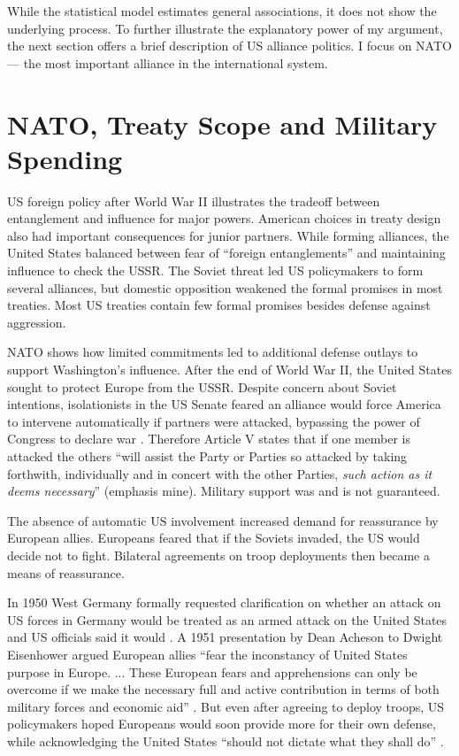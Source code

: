 \documentclass[12pt]{article}
\begin{document}
While the statistical model estimates general associations, it does not show the underlying process. 
To further illustrate the explanatory power of my argument, the next section offers a brief description of US alliance politics.   
I focus on NATO--- the most important alliance in the international system.  


\section{NATO, Treaty Scope and Military Spending}


US foreign policy after World War II illustrates the tradeoff between entanglement and influence for major powers.
American choices in treaty design also had important consequences for junior partners. 
While forming alliances, the United States balanced between fear of ``foreign entanglements'' and maintaining influence to check the USSR.
The Soviet threat led US policymakers to form several alliances, but domestic opposition weakened the formal promises in most treaties. 
Most US treaties contain few formal promises besides defense against aggression.  


NATO shows how limited commitments led to additional defense outlays to support Washington's influence.
After the end of World War II, the United States sought to protect Europe from the USSR. 
Despite concern about Soviet intentions, isolationists in the US Senate feared an alliance would force America to intervene automatically if partners were attacked, bypassing the power of Congress to declare war \citep[pg. 280-1]{Acheson1969}.
Therefore Article V states that if one member is attacked the others ``will assist the Party or Parties so attacked by taking forthwith, individually and in concert with the other Parties, \emph{such action as it deems necessary}'' (emphasis mine). 
Military support was and is not guaranteed. 


The absence of automatic US involvement increased demand for reassurance by European allies. 
Europeans feared that if the Soviets invaded, the US would decide not to fight. 
Bilateral agreements on troop deployments then became a means of reassurance. 


In 1950 West Germany formally requested clarification on whether an attack on US forces in Germany would be treated as an armed attack on the United States and US officials said it would \citep[pg. 395]{Acheson1969}. 
A 1951 presentation by Dean Acheson to Dwight Eisenhower argued European allies ``fear the inconstancy of United States purpose in Europe. ... These European fears and apprehensions can only be overcome if we make the necessary full and active contribution in terms of both military forces and economic aid'' \citep[pg. 3]{Acheson1951}.  
But even after agreeing to deploy troops, US policymakers hoped Europeans would soon provide more for their own defense, while acknowledging the United States ``should not dictate what they shall do'' \citep[pg. 2]{Johnson1950}. 
\end{document}
